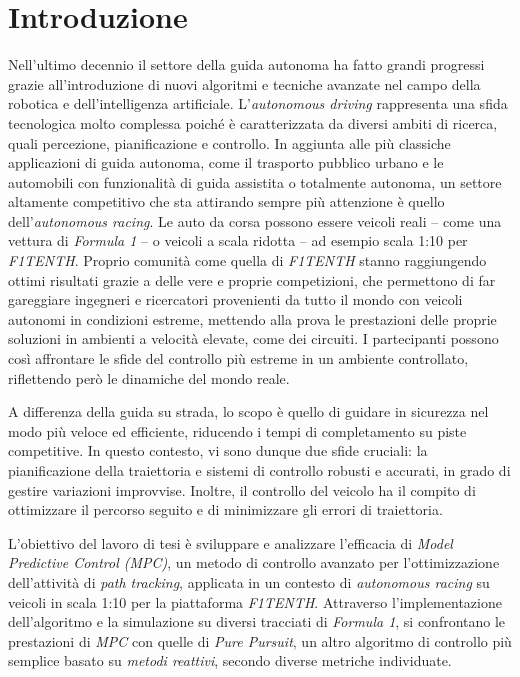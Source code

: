 \chapter{Introduzione}
\label{chap:chap1}
Nell'ultimo decennio il settore della guida autonoma ha fatto grandi progressi grazie
all'introduzione di nuovi algoritmi e tecniche avanzate nel campo della robotica e 
dell'intelligenza artificiale. L'\textit{autonomous driving} rappresenta una sfida
tecnologica molto complessa poiché è caratterizzata da diversi ambiti di ricerca, quali 
percezione, pianificazione e controllo.
In aggiunta alle più classiche applicazioni di guida autonoma, come il trasporto
pubblico urbano e le automobili con funzionalità di guida assistita o totalmente autonoma,
un settore altamente competitivo che sta attirando sempre più attenzione è quello 
dell'\textit{autonomous racing}. Le auto da corsa possono essere veicoli reali -- come 
una vettura di \textit{Formula 1} -- o veicoli a scala ridotta -- ad esempio scala 1:10 per \textit{F1TENTH}.
Proprio comunità come quella di \textit{F1TENTH} stanno raggiungendo ottimi risultati grazie a delle vere e
proprie competizioni, che permettono di far gareggiare ingegneri e ricercatori provenienti
da tutto il mondo con veicoli autonomi in condizioni estreme, mettendo alla prova le 
prestazioni delle proprie soluzioni in ambienti a velocità elevate, come dei circuiti.
I partecipanti possono così affrontare le sfide del controllo più estreme in un 
ambiente controllato, riflettendo però le dinamiche del mondo reale.

A differenza della guida su strada, lo scopo è quello di guidare in sicurezza nel modo
più veloce ed efficiente, riducendo i tempi di completamento su piste competitive. 
In questo contesto, vi sono dunque due sfide cruciali: la pianificazione della traiettoria e sistemi di controllo robusti e accurati, in grado di gestire variazioni improvvise.
Inoltre, il controllo del veicolo ha il compito di ottimizzare il percorso seguito e di minimizzare gli errori di traiettoria. 

L'obiettivo del lavoro di tesi è sviluppare e analizzare l'efficacia di 
\textit{Model Predictive Control (MPC)}, un metodo di controllo avanzato per 
l'ottimizzazione dell'attività di \textit{path tracking}, applicata in un
contesto di \textit{autonomous racing} su veicoli in scala 1:10 per la piattaforma
\textit{F1TENTH}.
Attraverso l'implementazione dell'algoritmo e la simulazione su diversi tracciati di 
\textit{Formula 1}, si confrontano le prestazioni di \textit{MPC} con quelle di 
\textit{Pure Pursuit}, un altro algoritmo di controllo più semplice basato su 
\textit{metodi reattivi}, secondo diverse metriche individuate.

